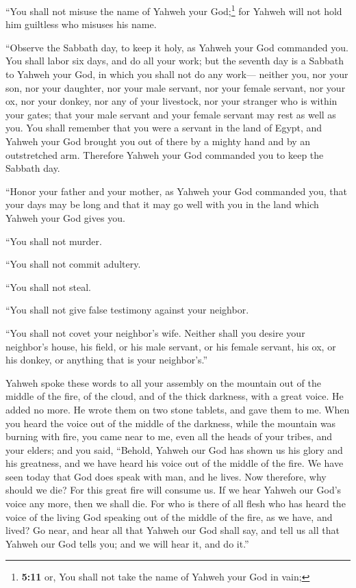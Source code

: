  ``You shall not misuse the name of Yahweh your
God;\footnote{\textbf{5:11} or, You shall not take the name of Yahweh
  your God in vain;} for Yahweh will not hold him guiltless who misuses
his name.

 ``Observe the Sabbath day, to keep it holy, as Yahweh
your God commanded you.  You shall labor six days, and do
all your work;  but the seventh day is a Sabbath to
Yahweh your God, in which you shall not do any work--- neither you, nor
your son, nor your daughter, nor your male servant, nor your female
servant, nor your ox, nor your donkey, nor any of your livestock, nor
your stranger who is within your gates; that your male servant and your
female servant may rest as well as you.  You shall
remember that you were a servant in the land of Egypt, and Yahweh your
God brought you out of there by a mighty hand and by an outstretched
arm. Therefore Yahweh your God commanded you to keep the Sabbath day.

 ``Honor your father and your mother, as Yahweh your God
commanded you, that your days may be long and that it may go well with
you in the land which Yahweh your God gives you.

 ``You shall not murder.

 ``You shall not commit adultery.

 ``You shall not steal.

 ``You shall not give false testimony against your
neighbor.

 ``You shall not covet your neighbor's wife. Neither
shall you desire your neighbor's house, his field, or his male servant,
or his female servant, his ox, or his donkey, or anything that is your
neighbor's.''

 Yahweh spoke these words to all your assembly on the
mountain out of the middle of the fire, of the cloud, and of the thick
darkness, with a great voice. He added no more. He wrote them on two
stone tablets, and gave them to me.  When you heard the
voice out of the middle of the darkness, while the mountain was burning
with fire, you came near to me, even all the heads of your tribes, and
your elders;  and you said, ``Behold, Yahweh our God has
shown us his glory and his greatness, and we have heard his voice out of
the middle of the fire. We have seen today that God does speak with man,
and he lives.  Now therefore, why should we die? For this
great fire will consume us. If we hear Yahweh our God's voice any more,
then we shall die.  For who is there of all flesh who has
heard the voice of the living God speaking out of the middle of the
fire, as we have, and lived?  Go near, and hear all that
Yahweh our God shall say, and tell us all that Yahweh our God tells you;
and we will hear it, and do it.''

